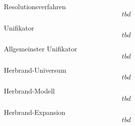 \documentclass[a7paper,print,grid=both]{kartei}
\begin{document}
\begin{karte}{Resolutionsverfahren}
\[tbd\]
\end{karte}
\begin{karte}{Unifikator}
\[tbd\]
\end{karte}
\begin{karte}{Allgemeinster Unifikator}
\[tbd\]
\end{karte}
\begin{karte}{Herbrand-Universum}
\[tbd\]
\end{karte}
\begin{karte}{Herbrand-Modell}
\[tbd\]
\end{karte}
\begin{karte}{Herbrand-Expansion}
\[tbd\]
\end{karte}
\end{document}
